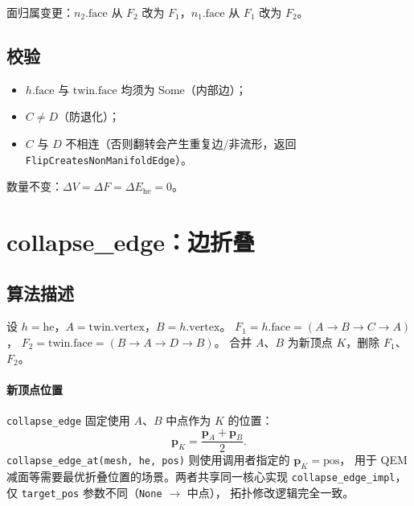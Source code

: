 \documentclass[11pt,a4paper]{article}
\begin{document}
面归属变更：$n_2.\mathrm{face}$ 从 $F_2$ 改为 $F_1$，$n_1.\mathrm{face}$ 从 $F_1$ 改为 $F_2$。

\subsection{校验}

\begin{itemize}
  \item $h.\mathrm{face}$ 与 $\mathrm{twin}.\mathrm{face}$ 均须为 $\mathrm{Some}$（内部边）；
  \item $C \neq D$（防退化）；
  \item $C$ 与 $D$ 不相连（否则翻转会产生重复边/非流形，返回
        \texttt{FlipCreatesNonManifoldEdge}）。
\end{itemize}

数量不变：$\Delta V = \Delta F = \Delta E_{\mathrm{he}} = 0$。

\section{collapse\_edge：边折叠}

\subsection{算法描述}

设 $h = \mathrm{he}$，$A = \mathrm{twin}.\mathrm{vertex}$，$B = h.\mathrm{vertex}$。
$F_1 = h.\mathrm{face} = (A \to B \to C \to A)$，
$F_2 = \mathrm{twin}.\mathrm{face} = (B \to A \to D \to B)$。
合并 $A$、$B$ 为新顶点 $K$，删除 $F_1$、$F_2$。

\paragraph{新顶点位置}
\texttt{collapse\_edge} 固定使用 $A$、$B$ 中点作为 $K$ 的位置：
\[
  \mathbf{p}_K = \frac{\mathbf{p}_A + \mathbf{p}_B}{2}.
\]
\texttt{collapse\_edge\_at(mesh, he, pos)} 则使用调用者指定的 $\mathbf{p}_K = \mathrm{pos}$，
用于 QEM 减面等需要最优折叠位置的场景。两者共享同一核心实现
\texttt{collapse\_edge\_impl}，仅 \texttt{target\_pos} 参数不同（\texttt{None} $\to$ 中点），
拓扑修改逻辑完全一致。
\end{document}
